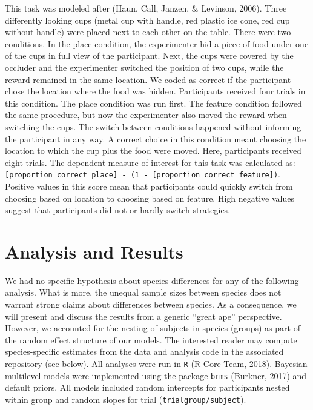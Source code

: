 \documentclass[10pt, letterpaper]{article}
\begin{document}
This task was modeled after (Haun, Call, Janzen, \& Levinson, 2006).
Three differently looking cups (metal cup with handle, red plastic ice
cone, red cup without handle) were placed next to each other on the
table. There were two conditions. In the place condition, the
experimenter hid a piece of food under one of the cups in full view of
the participant. Next, the cups were covered by the occluder and the
experimenter switched the position of two cups, while the reward
remained in the same location. We coded as correct if the participant
chose the location where the food was hidden. Participants received four
trials in this condition. The place condition was run first. The feature
condition followed the same procedure, but now the experimenter also
moved the reward when switching the cups. The switch between conditions
happened without informing the participant in any way. A correct choice
in this condition meant choosing the location to which the cup plus the
food were moved. Here, participants received eight trials. The dependent
measure of interest for this task was calculated as:
\texttt{{[}proportion\ correct\ place{]}\ -\ (1\ -\ {[}proportion\ correct\ feature{]})}.
Positive values in this score mean that participants could quickly
switch from choosing based on location to choosing based on feature.
High negative values suggest that participants did not or hardly switch
strategies.

\hypertarget{analysis-and-results}{%
\section{Analysis and Results}\label{analysis-and-results}}

We had no specific hypothesis about species differences for any of the
following analysis. What is more, the unequal sample sizes between
species does not warrant strong claims about differences between
species. As a consequence, we will present and discuss the results from
a generic ``great ape'' perspective. However, we accounted for the
nesting of subjects in species (groups) as part of the random effect
structure of our models. The interested reader may compute
species-specific estimates from the data and analysis code in the
associated repository (see below). All analyses were run in \texttt{R}
(R Core Team, 2018). Bayesian multilevel models were implemented using
the package \texttt{brms} (Burkner, 2017) and default priors. All models
included random intercepts for participants nested within group and
random slopes for trial (\texttt{trial\textbar{}group/subject}).
\end{document}
